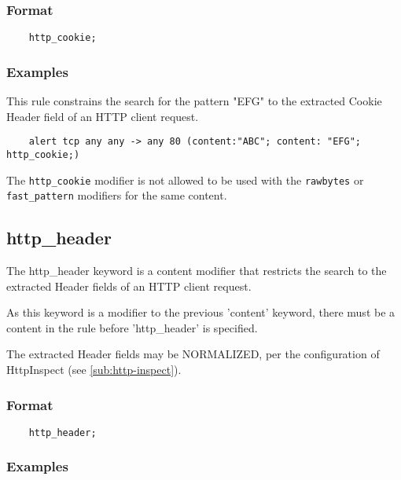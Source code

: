 \documentclass[english]{report}
\newenvironment{note}{
\samepage
    \vspace{10pt}{\textsf{
        {\hspace{7pt}\Huge{$\triangle$\hspace{-12.5pt}{\Large{$^!$}}}}\hspace{5pt}
        {\Large{NOTE}}
    }
    }
   \begin{center}
    \par\vspace{-17pt}

    \begin{lrbox}{\savepar}
    \begin{minipage}[r]{6in}
}
{
    \end{minipage}
    \end{lrbox}
    \fbox{
        \usebox{
            \savepar
	}
    }
    \par\vskip10pt
    \end{center}
}
\newenvironment{note}{
        \begin{rawhtml}
        <p><table border="1"><tr><td><b>
        Note:&nbsp;&nbsp;</b>
        \end{rawhtml}
}{
        \begin{rawhtml}
        </b></td></tr></table></p>
        \end{rawhtml}
}
\begin{document}
\subsubsection{Format}

\begin{verbatim}
    http_cookie;
\end{verbatim}

\subsubsection{Examples}

This rule constrains the search for the pattern "EFG" to the extracted Cookie
Header field of an HTTP client request.

\begin{verbatim}
    alert tcp any any -> any 80 (content:"ABC"; content: "EFG"; http_cookie;)
\end{verbatim}

\begin{note}

The \texttt{http\_cookie} modifier is not allowed to be used with the
\texttt{rawbytes} or \texttt{fast\_pattern} modifiers for the same content.

\end{note}

\subsection{http\_header}
\label{sub:HttpHeader}

The http\_header keyword is a content modifier that restricts the search to the
extracted Header fields of an HTTP client request.

As this keyword is a modifier to the previous 'content' keyword, there must be
a content in the rule before 'http\_header' is specified.

The extracted Header fields may be NORMALIZED, per the configuration of
HttpInspect (see \ref{sub:http-inspect}).

\subsubsection{Format}

\begin{verbatim}
    http_header;
\end{verbatim}

\subsubsection{Examples}
\end{document}
